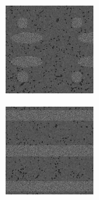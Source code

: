\documentclass[11pt]{article}
\begin{document}
\begin{figure}[H]
  \centering
  \begin{subfigure}[t]{0.35\textwidth}
    \centering
    \includegraphics[width=0.9\linewidth]{figs/deg45}
  \end{subfigure}
  \hspace{1em}
  \begin{subfigure}[t]{0.35\textwidth}
    \centering
    \includegraphics[width=0.9\linewidth]{figs/r8}

\end{subfigure}
\end{figure}
\end{document}
